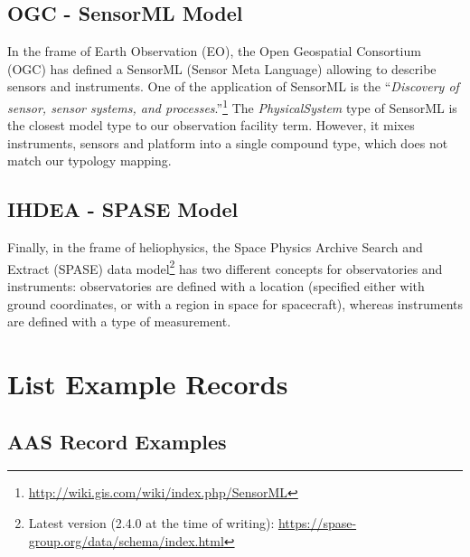 \documentclass[11pt,a4paper]{ivoa}
\begin{document}
\subsection{OGC - SensorML Model}
In the frame of Earth Observation (EO), the Open Geospatial Consortium
(OGC) has defined a SensorML (Sensor Meta Language) \citep{ogc-sensorml} 
allowing to describe sensors and instruments. One of the application of 
SensorML is the ``\emph{Discovery of sensor, sensor systems, and
processes}.''\footnote{\url{http://wiki.gis.com/wiki/index.php/SensorML}} 
The \emph{PhysicalSystem} type of SensorML is the closest model type to
our observation facility term.  However, it mixes instruments, sensors 
and platform into a single compound type, which does not match our 
typology mapping. 

\subsection{IHDEA - SPASE Model}
\label{appendx:models:spase}
Finally, in the frame of heliophysics, the Space Physics Archive Search
and Extract (SPASE) data model\footnote{Latest version (2.4.0 at the 
time of writing): \url{https://spase-group.org/data/schema/index.html}} 
\citep{Roberts:2018bi,spase-model} has two different
concepts for observatories and instruments: observatories are defined 
with a location (specified either with ground coordinates, or with a 
region in space for spacecraft), whereas instruments are defined with 
a type of measurement. 


\section{List Example Records}
\label{appendix:lists}
\subsection{AAS Record Examples}
\end{document}
